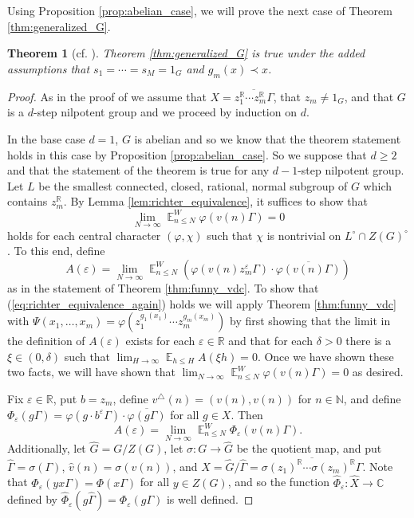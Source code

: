 \documentclass[12pt]{article}
\theoremstyle{plain} %
\newtheorem{theorem}{Theorem}[section]
\theoremstyle{definition} %
\theoremstyle{plain}
\theoremstyle{plain}
\numberwithin{equation}{section}
\newcommand{\N}{\mathbb{N}}
\newcommand{\R}{\mathbb{R}}
\newcommand{\C}{\mathbb{C}}
\renewcommand{\epsilon}{\varepsilon}
\renewcommand{\leq}{\leqslant}
\renewcommand{\geq}{\geqslant}
\newcommand{\1}{\mathbbm{1}}
\newcommand{\E}{\operatorname{\mathbb{E}}}
\newcommand{\oo}{\infty}
\begin{document}
Using Proposition \ref{prop:abelian_case}, we will prove the next case of Theorem \ref{thm:generalized_G}.
\begin{theorem}[cf. {\cite[Section 4.2]{Richter23}}]\label{thm:sub_linear}
    Theorem \ref{thm:generalized_G} is true under the added assumptions that $s_1=\cdots=s_M = 1_G$ and $g_{m}(x)\prec x$.
\end{theorem}
\begin{proof}
    As in the proof of \cite[Theorem 4.2]{Richter23} we assume that $X  = \overline{z_1^{\R}\cdots z_{m}^{\R}\Gamma}$, that $z_{m}\neq 1_G$, and that $G$ is a $d$-step nilpotent group and we proceed by induction on $d$.

    In the base case $d=1$, $G$ is abelian and so we know that the theorem statement holds in this case by Proposition \ref{prop:abelian_case}. So we suppose that $d\geq 2$ and that the statement of the theorem is true for any $d-1$-step nilpotent group. Let $L$ be the smallest connected, closed, rational, normal subgroup of $G$ which contains $z_{m}^{\R}$. By Lemma \ref{lem:richter_equivalence}, it suffices to show that 
    \begin{equation}\label{eq:richter_equivalence_again}
        \lim_{N\to\oo}\E_{n\leq N}^W\varphi(v(n)\Gamma)=0
    \end{equation}
    holds for each central character $(\varphi,\chi)$ such that $\chi$ is nontrivial on $L^{\circ}\cap Z(G)^{\circ}$. To this end, define
    \begin{equation}
        A(\epsilon) = \lim_{N\to\infty}\E_{n\leq N}^W\left(\varphi(v(n)z_{m}^{\epsilon}\Gamma)\cdot \overline{\varphi(v(n)\Gamma)}\right)
    \end{equation}
as in the statement of Theorem \ref{thm:funny_vdc}. To show that (\ref{eq:richter_equivalence_again}) holds we will apply Theorem \ref{thm:funny_vdc} with $\Psi(x_1,\dots, x_m) = \varphi(z_1^{g_1(x_1)}\cdots z_{m}^{g_{m}(x_m)})$ by first showing that the limit in the definition of $A(\epsilon)$ exists for each $\epsilon\in \R$ and that for each $\delta>0$ there is a $\xi\in (0,\delta)$ such that $\lim_{H\to\infty}\E_{h\leq H}A(\xi h) = 0$. Once we have shown these two facts, we will have shown that $\lim_{N\to\oo}\E_{n\leq N}^W\varphi(v(n)\Gamma)=0$ as desired.

 Fix $\epsilon\in \R$, put $b=z_{m}$, define $v^{\triangle}(n) = (v(n),v(n))$ for $n\in \N$, and define $\Phi_{\epsilon}(g\Gamma)=\varphi(g\cdot b^{\epsilon}\Gamma)\cdot \overline{\varphi(g\Gamma)}$ for all $g\in X$. Then 
\begin{equation}
    A(\epsilon)  = \lim_{N\to\oo}\E_{n\leq N}^W\Phi_{\epsilon}(v(n)\Gamma).
\end{equation}
Additionally, let $\widehat{G} = G/Z(G)$, let $\sigma:G\rightarrow \widehat{G}$ be the quotient map, and put $\widehat{\Gamma} = \sigma(\Gamma)$, $\widehat{v}(n) = \sigma(v(n))$, and $\widehat{X} = \widehat{G}/\widehat{\Gamma} = \overline{\sigma(z_1)^{\R}\cdots \sigma(z_{m})^{\R}\Gamma}$. Note that $\Phi_{\epsilon}(yx\Gamma) = \Phi(x\Gamma)$ for all $y\in Z(G)$, and so the function $\widehat{\Phi}_{\epsilon}:\widehat{X}\rightarrow \C$ defined by  $\widehat{\Phi}_{\epsilon}(g\widehat{\Gamma}) = {\Phi}_{\epsilon}(g\Gamma)$ is well defined.



\end{proof}
\end{document}
